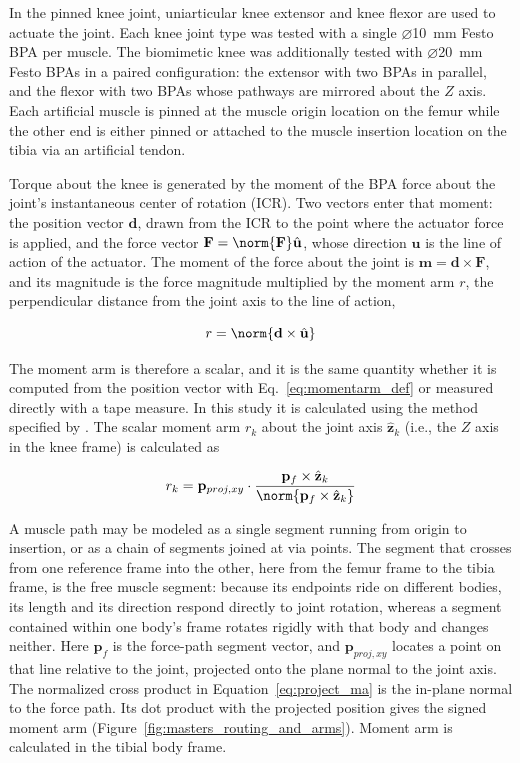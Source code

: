 In the pinned knee joint, uniarticular knee extensor and knee flexor are used to actuate the joint. Each knee joint type was tested with a single $\diameter$\qty{10}{\mm} Festo BPA per muscle. The biomimetic knee was additionally tested with $\diameter$\qty{20}{\mm} Festo BPAs in a paired configuration: the extensor with two BPAs in parallel, and the flexor with two BPAs whose pathways are mirrored about the $Z$ axis. Each artificial muscle is pinned at the muscle origin location on the femur while the other end is either pinned or attached to the muscle insertion location on the tibia via an artificial tendon.

Torque about the knee is generated by the moment of the BPA force about the joint's instantaneous center of rotation (ICR). Two vectors enter that moment: the position vector $\mathbf{d}$, drawn from the ICR to the point where the actuator force is applied, and the force vector $\mathbf{F} = \norm{\mathbf{F}}\hat{\mathbf{u}}$, whose direction $\hat{\mathbf{u}}$ is the line of action of the actuator. The moment of the force about the joint is $\mathbf{m} = \mathbf{d} \times \mathbf{F}$, and its magnitude is the force magnitude multiplied by the moment arm $r$, the perpendicular distance from the joint axis to the line of action,

\begin{equation}
    r = \norm{\mathbf{d} \times \hat{\mathbf{u}}}
    \label{eq:momentarm_def}
\end{equation}

The moment arm is therefore a scalar, and it is the same quantity whether it is computed from the position vector with Eq.~\eqref{eq:momentarm_def} or measured directly with a tape measure. In this study it is calculated using the method specified by \citet{young_analyzing_2019}. The scalar moment arm $r_{k}$ about the joint axis $\hat{\mathbf{z}}_{k}$ (i.e., the $Z$ axis in the knee frame) is calculated as 

\begin{equation}
    r_{k} = \mathbf{p}_{proj,xy} \cdot \frac{\mathbf{p}_{f} \times \hat{\mathbf{z}}_{k}} { \norm{\mathbf{p}_{f} \times \hat{\mathbf{z}}_{k}} } \label{eq:project_ma}
\end{equation}

A muscle path may be modeled as a single segment running from origin to insertion, or as a chain of segments joined at via points. The segment that crosses from one reference frame into the other, here from the femur frame to the tibia frame, is the free muscle segment: because its endpoints ride on different bodies, its length and its direction respond directly to joint rotation, whereas a segment contained within one body's frame rotates rigidly with that body and changes neither. Here $\mathbf{p}_{f}$ is the force-path segment vector, and $\mathbf{p}_{proj,xy}$ locates a point on that line relative to the joint, projected onto the plane normal to the joint axis. The normalized cross product in Equation~\eqref{eq:project_ma} is the in-plane normal to the force path. Its dot product with the projected position gives the signed moment arm (Figure~\ref{fig:masters_routing_and_arms}). Moment arm is calculated in the tibial body frame.

